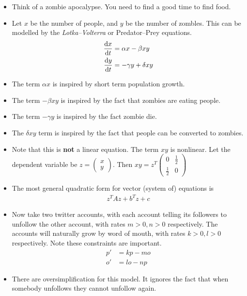 \documentclass[a4paper, 10pt]{article}
\numberwithin{equation}{section}
\begin{document}
\begin{itemize}
    \item Think of a zombie apocalypse. You need to find a good time to find food. 
    \item Let $x$ be the number of people, and $y$ be the number of zombles. This can be modelled by the \textit{Lotka--Volterra} or Predator--Prey equations.
    \begin{align}
        \derivative{x}{t}&=\alpha x-\beta xy\\
        \derivative{y}{t}&=-\gamma y+\delta xy
    \end{align}
    \item The term $\alpha x$ is inspired by short term population growth.
    \item The term $-\beta xy$ is inspired by the fact that zombies are eating people.
    \item The term $-\gamma y$ is inspired by the fact zombie die.
    \item The $\delta xy$ term is inspired by the fact that people can be converted to zombies.
    \item Note that this is \textbf{not} a linear equation. The term $xy$ is nonlinear. Let the dependent variable be $z=\begin{pmatrix}
        x\\y
    \end{pmatrix}$. Then $xy=z^T\begin{pmatrix}
        0&\frac{1}{2}\\\frac{1}{2}&0
    \end{pmatrix}$
    \item The most general quadratic form for vector (system of) equations is 
    \begin{align}
        z^TAz+b^Tz+c
    \end{align}
    \item Now take two twitter accounts, with each account telling its followers to unfollow the other account, with rates $m>0,n>0$ respectively. The accounts will naturally grow by word of mouth, with rates $k>0,l>0$ respectively. Note these constraints are important.
    \begin{align}
        p'&=kp-mo\\
        o'&=lo-np
    \end{align}
    \item There are oversimplification for this model. It ignores the fact that when somebody unfollows they cannot unfollow again.
\end{itemize}
\end{document}
